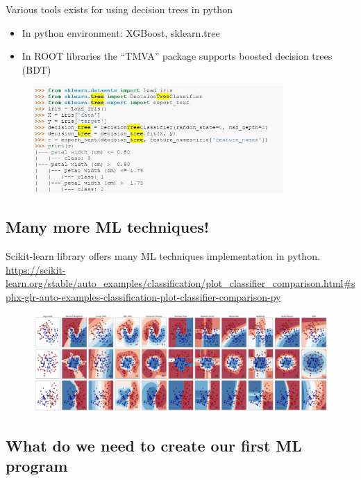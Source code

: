 Various tools exists for using decision trees in python\\
\begin{itemize}
	\item In python environment: XGBoost, sklearn.tree
	\item In ROOT libraries the “TMVA” package supports boosted decision trees (BDT)
\end{itemize}

\newpage

\begin{figure}[h]
	\centering
	\includegraphics[width=0.85\textwidth]{figure_ml/decision_trees_tools}
\end{figure}
\FloatBarrier


\subsection{Many more ML techniques!}

Scikit-learn library offers many ML techniques implementation in python.\\
\url{https://scikit-learn.org/stable/auto_examples/classification/plot_classifier_comparison.html#sphx-glr-auto-examples-classification-plot-classifier-comparison-py}

\begin{figure}[ht]
	\centering
	\includegraphics[width=1\textwidth]{figure_ml/scikit.png}
\end{figure}
\FloatBarrier

\subsection{What do we need to create our first ML program}

